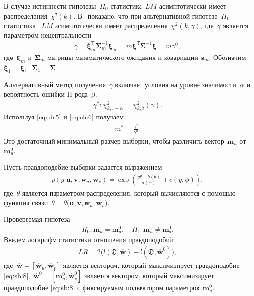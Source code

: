 В случае истинности гипотезы~$H_0$ статистика~$LM$ асимптотически имеет распределения~$\chi^2(k)$.  В~\cite{self1988} показано, что при альтернативной гипотезе~$H_1$ статистика ~$LM$ асимптотически имеет распределения~$\chi^2(k,\gamma)$, где~$\gamma$ является параметром нецентральности
\[
\label{eq:sb:5}
\begin{aligned}
	\gamma = \bm{\xi}_{m}^{\mathsf{T}}\bm{\Sigma}^{-1}_{m}\bm{\xi}_{m} = m\bm{\xi}^{\mathsf{T}}\bm{\Sigma}^{-1}\bm{\xi}= m\gamma^0,
\end{aligned}
\]
где~$\bm{\xi}_{m}$ и~$\bm{\Sigma}_{m}$ матрицы математического ожидания и ковариации~$\textbf{s}_{m}$. Обозначим~$\bm{\xi}_1 = \bm{\xi}$, ~$\bm{\Sigma}_1 = \bm{\Sigma}$. 
	
Альтернативный метод получения~$\gamma$ включает условия на уровне значимости~$\alpha$ и вероятность ошибки II рода~$\beta$:
\[
\label{eq:sb:6}
\begin{aligned}
	\gamma^*:\chi^2_{k, 1-\alpha} = \chi^2_{k, \beta}\left(\gamma\right).
\end{aligned}
\]
Используя \eqref{eq:sb:5} и \eqref{eq:sb:6} получаем
\[
\label{eq:sb:7}
\begin{aligned}
	m^* = \frac{\gamma^*}{\gamma^0}.
\end{aligned}
\]
Это достаточный минимальный размер выборки, чтобы различить вектор~$\textbf{m}_{u}$ от~$\textbf{m}^0_{u}$.

Пусть правдоподобие выборки задается выражением
\[
\label{eq:sb:8}
\begin{aligned}
	p(y|\textbf{u},\textbf{v},\textbf{w}_{u},\textbf{w}_{v}) = \exp\left(\frac{y\theta- b(\theta)}{a(\phi)} + c\left(y, \phi\right)\right),
\end{aligned}
\]
где~$\theta$ является параметром распределения, который вычисляются с помощью функции связи~$\theta=\theta\bigr(\textbf{u},\textbf{v},\textbf{w}_{u},\textbf{w}_{v}\bigr)$.

Проверяемая гипотеза
\[
\label{eq:sb:9}
\begin{aligned}
	H_0: \textbf{m}_{u} = \textbf{m}^0_{u}, \quad H_1: \textbf{m}_{u} \not= \textbf{m}^0_{u}.
\end{aligned}
\]
Введем логарифм статистики отношения правдоподобий:
\[
\label{eq:sb:10}
\begin{aligned}
	LR = 2\Big(l\left(\mathfrak{D}, \hat{\textbf{w}}\right) - l\left(\mathfrak{D}, \hat{\textbf{w}}^0\right)\Big),
\end{aligned}
\]
где~$\hat{\textbf{w}} = [\hat{\textbf{w}}_{u},\hat{\textbf{w}}_{v}]$ является вектором, который максимизирует правдоподобие \eqref{eq:sb:8},~$\hat{\textbf{w}}^{0} = [\textbf{m}^{0}_{u},\hat{\textbf{w}}^{0}_{v}]$ является вектором, который максимизирует правдоподобие \eqref{eq:sb:8} с фиксируемым подвектором параметров~$\textbf{m}^{0}_{u}$.

